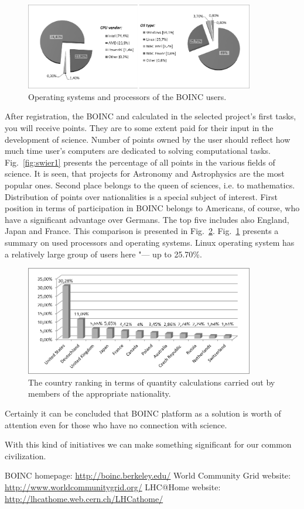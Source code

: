 \documentclass[10pt, a5paper]{article}
\begin{document}
\begin{figure}[h]
  \centering
  \includegraphics[width=10cm]{104_2013_w_Swierczewski_boinc_2}
  \caption{Operating systems and processors of the BOINC users.}\label{fig:swier2}
\end{figure}


After registration, the BOINC and calculated in the selected pro\-ject's first tasks, you will receive points. They are to some extent paid for their input in the development of science.
Number of points owned by the user should reflect how much time user's computers are dedicated to solving computational tasks. Fig.~\ref{fig:swier1} presents the percentage of all points in the various fields of science. It is seen, that projects for Astronomy and Astrophysics are the most popular ones. Second place belongs to the queen of sciences, i.e. to mathematics. Distribution of points over  nationalities is a special subject of interest. First position in terms of participation in BOINC belongs to Americans, of course, who have a significant advantage over Germans. The top five includes also England, Japan and France. This comparison is presented in Fig.~\ref{fig:swier3}. Fig.~\ref{fig:swier2} presents a summary on used processors and operating systems. Linux operating system has a relatively large group of users here "--- up to 25.70\%.

\begin{figure}[h]
  \centering
  \includegraphics[width=10cm]{104_2013_w_Swierczewski_boinc_3}
  \caption{The country ranking in terms of quantity calculations carried out by members of the appropriate nationality.}\label{fig:swier3}
\end{figure}

Certainly it can be concluded that BOINC platform as a solution is worth of attention even for those who have no connection with science.

With this kind of initiatives we can make something significant for our common civilization.

\begin{thebibliography}{9}
 BOINC homepage: \url{http://boinc.berkeley.edu/}
 World Community Grid website: \url{http://www.worldcommunitygrid.org/}
 LHC@Home website: \url{http://lhcathome.web.cern.ch/LHCathome/}
\end{thebibliography}
\end{document}
